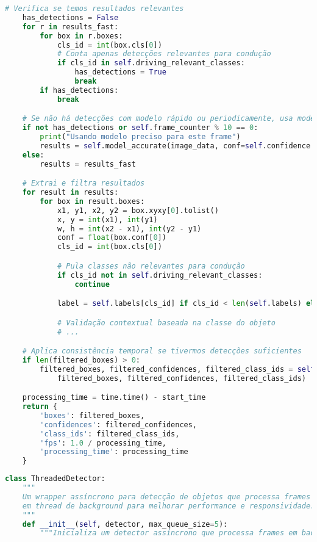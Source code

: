 \documentclass[
	12pt,				%
	oneside, %
	a4paper,			%
	english,			%
	french,				%
	spanish,			%
	brazil				%
	]{abntex2}
\begin{document}
\begin{apendicesenv}
\begin{lstlisting}[language=Python, caption=Processamento de imagens no servidor com YOLOv8., label=lst:server_process_image]
    # Verifica se temos resultados relevantes
    has_detections = False
    for r in results_fast:
        for box in r.boxes:
            cls_id = int(box.cls[0])
            # Conta apenas detecções relevantes para condução
            if cls_id in self.driving_relevant_classes:
                has_detections = True
                break
        if has_detections:
            break

    # Se não há detecções com modelo rápido ou periodicamente, usa modelo preciso
    if not has_detections or self.frame_counter % 10 == 0:
        print("Usando modelo preciso para este frame")
        results = self.model_accurate(image_data, conf=self.confidence * 0.7, device=self.device)
    else:
        results = results_fast

    # Extrai e filtra resultados
    for result in results:
        for box in result.boxes:
            x1, y1, x2, y2 = box.xyxy[0].tolist()
            x, y = int(x1), int(y1)
            w, h = int(x2 - x1), int(y2 - y1)
            conf = float(box.conf[0])
            cls_id = int(box.cls[0])

            # Pula classes não relevantes para condução
            if cls_id not in self.driving_relevant_classes:
                continue

            label = self.labels[cls_id] if cls_id < len(self.labels) else "unknown"

            # Validação contextual baseada na classe do objeto
            # ...

    # Aplica consistência temporal se tivermos detecções suficientes
    if len(filtered_boxes) > 0:
        filtered_boxes, filtered_confidences, filtered_class_ids = self.apply_temporal_consistency(
            filtered_boxes, filtered_confidences, filtered_class_ids)

    processing_time = time.time() - start_time
    return {
        'boxes': filtered_boxes,
        'confidences': filtered_confidences,
        'class_ids': filtered_class_ids,
        'fps': 1.0 / processing_time,
        'processing_time': processing_time
    }
\end{lstlisting}

\begin{lstlisting}[language=Python, caption=Implementação de detector assíncrono com \textit{threads}., label=lst:threaded_detector]
class ThreadedDetector:
    """
    Um wrapper assíncrono para detecção de objetos que processa frames
    em thread de background para melhorar performance e responsividade.
    """
    def __init__(self, detector, max_queue_size=5):
        """Inicializa um detector assíncrono que processa frames em background


\end{lstlisting}
\end{apendicesenv}
\end{document}

